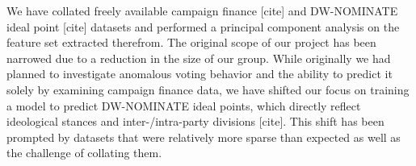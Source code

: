 \documentclass[10]{article}
\begin{document}
We have collated freely available campaign finance [cite] and DW-NOMINATE ideal point [cite] datasets and performed a principal component analysis on the feature set extracted therefrom. The original scope of our project has been narrowed due to a reduction in the size of our group. While originally we had planned to investigate anomalous voting behavior and the ability to predict it solely by examining campaign finance data, we have shifted our focus on training a model to predict DW-NOMINATE ideal points, which directly reflect ideological stances and inter-/intra-party divisions [cite]. This shift has been prompted by datasets that were relatively more sparse than expected as well as the challenge of collating them.\\
\end{document}
